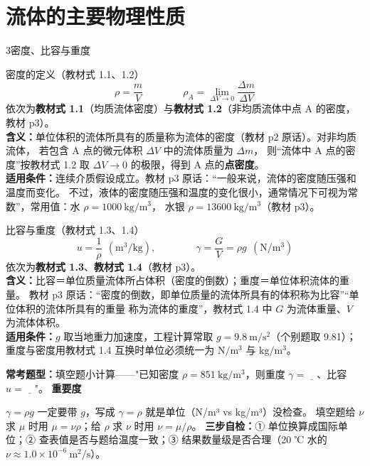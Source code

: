 \section{流体的主要物理性质}

\begin{kaodian}{3}{密度、比容与重度}
\begin{gongshi}{密度的定义（教材式 1.1、1.2）}
\[ \rho=\frac{m}{V}\qquad\qquad \rho_A=\lim_{\Delta V\to0}\frac{\Delta m}{\Delta V} \]
\noindent 依次为\textbf{教材式 1.1}（均质流体密度）与\textbf{教材式 1.2}（非均质流体中点 A 的密度，教材 p3）。\\
\textbf{含义：}单位体积的流体所具有的质量称为流体的密度（教材 p2 原话）。对非均质流体，
若包含 A 点的微元体积 $\Delta V$ 中的流体质量为 $\Delta m$，
则“流体中 A 点的密度”按教材式 1.2 取 $\Delta V\to0$ 的极限，得到 A 点的\textbf{点密度}。\\
\textbf{适用条件：}连续介质假设成立。教材 p3 原话：“一般来说，流体的密度随压强和温度而变化。
不过，液体的密度随压强和温度的变化很小，通常情况下可视为常数”，常用值：水 $\rho=1000\ \mathrm{kg/m^3}$，
水银 $\rho=13600\ \mathrm{kg/m^3}$（教材 p3）。
\end{gongshi}

\begin{gongshi}{比容与重度（教材式 1.3、1.4）}
\[ u=\frac{1}{\rho}\ \ (\mathrm{m^3/kg}),\qquad\qquad \gamma=\frac{G}{V}=\rho g\ \ (\mathrm{N/m^3}) \]
\noindent 依次为\textbf{教材式 1.3}、\textbf{教材式 1.4}（教材 p3）。\\
\textbf{含义：}比容＝单位质量流体所占体积（密度的倒数）；重度＝单位体积流体的重量。
教材 p3 原话：“密度的倒数，即单位质量的流体所具有的体积称为比容”“单位体积的流体所具有的重量
称为流体的重度”，教材式 1.4 中 $G$ 为流体重量、$V$ 为流体体积。\\
\textbf{适用条件：}$g$ 取当地重力加速度，工程计算常取 $g=9.8\ \mathrm{m/s^2}$（个别题取 9.81）；
重度与密度用教材式 1.4 互换时单位必须统一为 $\mathrm{N/m^3}$ 与 $\mathrm{kg/m^3}$。
\end{gongshi}

\textbf{常考题型：}填空题小计算——"已知密度 $\rho=851\ \mathrm{kg/m^3}$，则重度 $\gamma=\underline{\quad}$、比容 $u=\underline{\quad}$"。
\textbf{重要度 }\quad{}\quad{}

\begin{banfa}
$\gamma=\rho g$ 一定要带 $g$，写成 $\gamma=\rho$ 就是单位（N/m³ vs kg/m³）没检查。
填空题给 $\nu$ 求 $\mu$ 时用 $\mu=\nu\rho$；给 $\rho$ 求 $\nu$ 时用 $\nu=\mu/\rho$。
\textbf{三步自检：}① 单位换算成国际单位；② 查表值是否与题给温度一致；③ 结果数量级是否合理（20 ℃ 水的 $\nu\approx1.0\times10^{-6}\ \mathrm{m^2/s}$）。
\end{banfa}
\end{kaodian}

